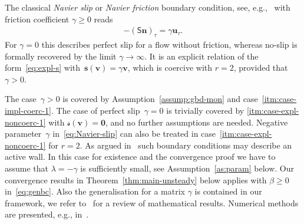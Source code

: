 \documentclass[reqno,a4paper]{amsart}
\def\tens#1{\pmb{\mathsf{#1}}}
\def\vec#1{\boldsymbol{#1}}
\def\b0{\vec{0}}
\def\bn{\vec{n}}
\def\bs{\vec{s}}
\def\bu{\vec{u}}
\def\bv{\vec{v}}
\def\BS{\tens{S}}
\def\Srel{\vec{\mathcal{s}}}
\begin{document}
	\begin{example}\label{ex:Navier}
		The classical \emph{Navier slip} or \emph{Navier friction} boundary condition, see, e.g.,~\cite{V.1987,Gjerde2022} with friction coefficient $\gamma \geq 0$ reads
		\begin{align}\label{eq:Navier-slip}
			- (\BS \bn)_{\tau} = \gamma \bu_\tau. 
		\end{align}
		For $\gamma = 0$ this describes perfect slip for a flow without friction, whereas no-slip  is formally recovered by the limit $\gamma \to \infty$. 
		It is an explicit relation of the form~\eqref{eq:expl-s} with~$\mathcal{\bs}(\bv) = \gamma \bv$, which is coercive with $r = 2$, provided that~$\gamma >0$.  
		
		The case~$\gamma >0 $ is covered by Assumption~\ref{assump:gbd-mon} and case~\eqref{itm:case-impl-coerc-1}. 
		The case of perfect slip~$\gamma = 0$ is trivially covered by \eqref{itm:case-expl-noncoerc-1} with $\Srel(\bv) = \b0$, and no further assumptions are needed. 
		Negative parameter~$\gamma$ in~\eqref{eq:Navier-slip} can also be treated in case~\eqref{itm:case-expl-noncoerc-1} for $r = 2$. 
		As argued in~\cite{Gjerde2022} such boundary conditions may describe an active wall. 
		In this case for existence and the convergence proof we  have to assume that $\lambda = - \gamma $ is sufficiently small, see Assumption~\ref{as:param} below.    
		Our convergence results in Theorem~\ref{thm:main-unsteady}  below applies with $\beta \geq 0$ in~\eqref{eq:genbc}. 
		Also the generalisation for a matrix $\gamma$ is contained in our framework, we refer to~\cite{MaekawaMazzucato2018} for a review of mathematical results.  
		Numerical methods are presented, e.g., in~\cite{V.1987,V.1991}. 
	\end{example}
	
\end{document}
